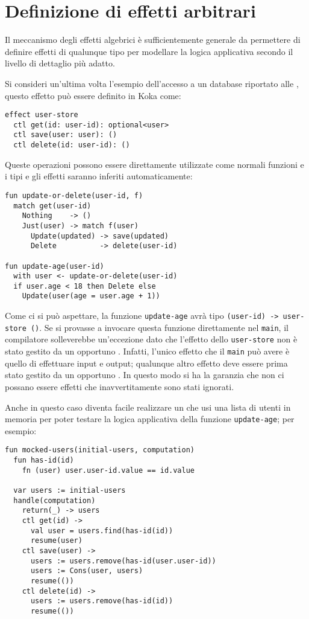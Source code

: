 \section{Definizione di effetti arbitrari}
Il meccanismo degli effetti algebrici è sufficientemente generale da permettere di definire effetti di qualunque tipo per modellare la logica applicativa secondo il livello di dettaglio più adatto.

Si consideri un'ultima volta l'esempio dell'accesso a un database riportato alle , questo effetto può essere definito in Koka come:
\begin{lstlisting}[language=koka]
effect user-store
  ctl get(id: user-id): optional<user>
  ctl save(user: user): ()
  ctl delete(id: user-id): ()
\end{lstlisting}

Queste operazioni possono essere direttamente utilizzate come normali funzioni e i tipi e gli effetti saranno inferiti automaticamente:
\begin{lstlisting}[language=koka]
fun update-or-delete(user-id, f)
  match get(user-id)
    Nothing    -> ()
    Just(user) -> match f(user)  
      Update(updated) -> save(updated)
      Delete          -> delete(user-id)

fun update-age(user-id)
  with user <- update-or-delete(user-id)
  if user.age < 18 then Delete else
    Update(user(age = user.age + 1))
\end{lstlisting}

Come ci si può aspettare, la funzione \lstinline{update-age} avrà tipo \lstinline{(user-id) -> user-store ()}.
Se si provasse a invocare questa funzione direttamente nel \lstinline{main}, il compilatore solleverebbe un'eccezione dato che l'effetto dello \lstinline{user-store} non è stato gestito da un opportuno .
Infatti, l'unico effetto che il \lstinline{main} può avere è quello di effettuare input e output; qualunque altro effetto deve essere prima stato gestito da un opportuno . In questo modo si ha la garanzia che non ci possano essere effetti che inavvertitamente sono stati ignorati.

Anche in questo caso diventa facile realizzare un  che usi una lista di utenti in memoria per poter testare la logica applicativa della funzione \lstinline{update-age}; per esempio:
\begin{lstlisting}[language=koka]
fun mocked-users(initial-users, computation)
  fun has-id(id)
    fn (user) user.user-id.value == id.value

  var users := initial-users
  handle(computation)
    return(_) -> users
    ctl get(id) ->
      val user = users.find(has-id(id))
      resume(user)
    ctl save(user) -> 
      users := users.remove(has-id(user.user-id))
      users := Cons(user, users)
      resume(())
    ctl delete(id) ->
      users := users.remove(has-id(id))
      resume(())
\end{lstlisting}


